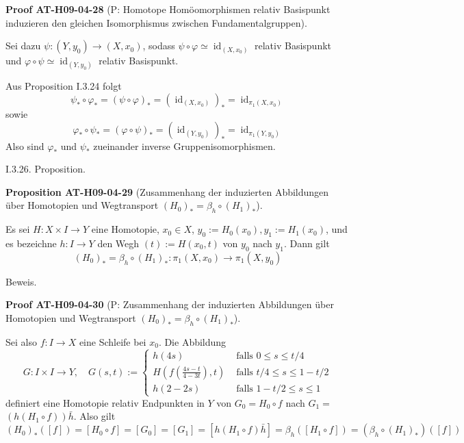 \documentclass[10pt, letterpaper]{article}
\newcommand{\CustomHeading}[3]{%
  \par\medskip\noindent%
  \textbf{#1 #2} \textnormal{(#3)}.\enskip%
}
\newenvironment{PROP}[2]{\begin{unitbox}\CustomHeading{Proposition}{#1}{#2}}{\end{unitbox}}
\newenvironment{PROOF}[2]{\begin{unitbox}\CustomHeading{Proof}{#1}{#2}}{\end{unitbox}}
\begin{document}
\begin{PROOF}{AT-H09-04-28}{P: Homotope Homöomorphismen relativ Basispunkt induzieren den gleichen Isomorphismus zwischen Fundamentalgruppen}
Sei dazu $\psi:\left(Y, y_{0}\right) \rightarrow\left(X, x_{0}\right)$, sodass $\psi \circ \varphi \simeq \operatorname{id}_{\left(X, x_{0}\right)}$ relativ Basispunkt und $\varphi \circ \psi \simeq \operatorname{id}_{\left(Y, y_{0}\right)}$ relativ Basispunkt. 

Aus Proposition I.3.24 folgt 
$$\psi_{*} \circ \varphi_{*}=(\psi \circ \varphi)_{*}=\left(\operatorname{id}_{\left(X, x_{0}\right)}\right)_{*}=\operatorname{id}_{\pi_{1}\left(X, x_{0}\right)}$$ 
sowie 
$$\varphi_{*} \circ \psi_{*}=(\varphi \circ \psi)_{*}=\left(\operatorname{id}_{\left(Y, y_{0}\right)}\right)_{*}=\operatorname{id}_{\pi_{1}\left(Y, y_{0}\right)}$$ 
Also sind $\varphi_{*}$ und $\psi_{*}$ zueinander inverse Gruppenisomorphismen.
\end{PROOF}


I.3.26. Proposition. 


\begin{PROP}{AT-H09-04-29}{Zusammenhang der induzierten Abbildungen über Homotopien und Wegtransport $\left(H_{0}\right)_{*}=\beta_{h} \circ\left(H_{1}\right)_{*}$}
Es sei $H: X \times I \rightarrow Y$ eine Homotopie, $x_{0} \in X$, $y_{0}:=H_{0}\left(x_{0}\right), y_{1}:=H_{1}\left(x_{0}\right)$, und es bezeichne $h: I \rightarrow Y$ den Wegh $(t):=H\left(x_{0}, t\right)$ von $y_{0}$ nach $y_{1}$. Dann gilt 
$$\left(H_{0}\right)_{*}=\beta_{h} \circ\left(H_{1}\right)_{*}: \pi_{1}\left(X, x_{0}\right) \rightarrow \pi_{1}\left(X, y_{0}\right)$$
\end{PROP}



Beweis. 

\begin{PROOF}{AT-H09-04-30}{P: Zusammenhang der induzierten Abbildungen über Homotopien und Wegtransport $\left(H_{0}\right)_{*}=\beta_{h} \circ\left(H_{1}\right)_{*}$}
Sei also $f: I \rightarrow X$ eine Schleife bei $x_{0}$. Die Abbildung
$$
G: I \times I \rightarrow Y, \quad G(s, t):= \begin{cases}h(4 s) & \text { falls } 0 \leq s \leq t / 4 \\ H\left(f\left(\frac{4 s-t}{4-3 t}\right), t\right) & \text { falls } t / 4 \leq s \leq 1-t / 2 \\ h(2-2 s) & \text { falls } 1-t / 2 \leq s \leq 1\end{cases}
$$
definiert eine Homotopie relativ Endpunkten in $Y$ von $G_{0}=H_{0} \circ f$ nach $G_{1}=$ $\left(h\left(H_{1} \circ f\right)\right) \bar{h}$. Also gilt 
$$\left(H_{0}\right)_{*}([f])=\left[H_{0} \circ f\right]=\left[G_{0}\right]=\left[G_{1}\right]=\left[h\left(H_{1} \circ f\right) \bar{h}\right]=\beta_{h}\left(\left[H_{1} \circ f\right]\right)=\left(\beta_{h} \circ\left(H_{1}\right)_{*}\right)([f])$$
\end{PROOF}
\end{document}
